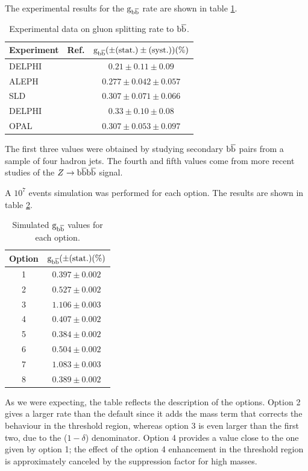 \documentclass[a4paper,12pt]{article}
\begin{document}
The experimental results for the ${\mathrm g}_{{\mathrm b}\overline{\mathrm b}}$ rate are shown in table \ref{table:gbbMeasurements}.

\begin{table}[!h]
\caption{Experimental data on gluon splitting rate to ${\mathrm b}\overline{\mathrm b}$.}\smallskip
\label{table:gbbMeasurements}
\centering 
\begin{tabular}{lcc}
\hline \hline  
\smallskip
Experiment & Ref. & ${\mathrm g}_{{\mathrm b}\overline{\mathrm b}} (\pm(\text{stat.})\pm(\text{syst.})) (\%)$ \\ 
\hline
DELPHI & \cite{Abreu:1997nf} &  $0.21\pm0.11\pm0.09$ \\
ALEPH & \cite{Barate:1998vs} & $0.277\pm0.042\pm0.057$ \\
SLD & \cite{Abe:1999qg} & $0.307\pm0.071\pm0.066$ \\
DELPHI & \cite{Abreu:1999qh} & $0.33\pm0.10\pm0.08$ \\
OPAL & \cite{Abbiendi:2000zt} & $0.307\pm0.053\pm0.097$ \\
\end{tabular}
\end{table}
The first three values were obtained by studying secondary ${\mathrm b}\overline{\mathrm b}$ pairs from a sample of four hadron jets. The fourth and fifth values come from more recent studies of the $Z\to{\mathrm b}\overline{\mathrm b}{\mathrm b}\overline{\mathrm b}$ signal.

A $10^7$ events simulation was performed for each option. The results are shown in table \ref{table:gbbResults}.

\begin{table}[!h]
\caption{Simulated ${\mathrm g}_{{\mathrm b}\overline{\mathrm b}}$ values for each option.}\smallskip
\label{table:gbbResults}
\centering 
\begin{tabular}{cc}
\hline \hline  
\smallskip
Option & ${\mathrm g}_{{\mathrm b}\overline{\mathrm b}} (\pm(\text{stat.}) (\%)$ \\ 
\hline
1 &  $0.397\pm0.002$ \\
2 &  $0.527\pm0.002$ \\
3 &  $1.106\pm0.003$ \\
4 &  $0.407\pm0.002$ \\
5 &  $0.384\pm0.002$ \\
6 &  $0.504\pm0.002$ \\
7 &  $1.083\pm0.003$ \\
8 &  $0.389\pm0.002$ \\

\end{tabular}
\end{table}

As we were expecting, the table reflects the description of the options. Option 2 gives a larger rate than the default since it adds the mass term that corrects the behaviour in the threshold region, whereas option 3 is even larger than the first two, due to the ($1-\delta$) denominator. Option 4 provides a value close to the one given by option 1; the effect of the option 4 enhancement in the threshold region is approximately canceled by the suppression factor for high masses.
\end{document}
